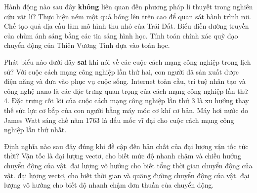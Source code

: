 \begin{ex}%
	Hành động nào sau đây \textbf{không} liên quan đến phương pháp lí thuyết trong nghiên cứu vật lí?
	\choice
	{\True Thực hiện ném một quả bóng lên trên cao để quan sát hành trình rơi.}
	{Chế tạo quả địa cầu làm mô hình thu nhỏ của Trái Đất.}
	{Biểu diễn đường truyền của chùm ánh sáng bằng các tia sáng hình học.}
	{Tính toán chính xác quỹ đạo chuyển động của Thiên Vương Tinh dựa vào toán học.}
\end{ex}

\begin{ex}%
	Phát biểu nào dưới đây \textbf{sai} khi nói về các cuộc cách mạng công nghiệp trong lịch sử?
	\choice
	{Với cuộc cách mạng công nghiệp lần thứ hai, con người đã sản xuất được điện năng và đưa vào phục vụ cuộc sống.}
	{Internet toàn cầu, trí tuệ nhân tạo và công nghệ nano là các đặc trưng quan trọng của cách mạng công nghiệp lần thứ 4.}
	{\True Đặc trưng cốt lõi của cuộc cách mạng công nghiệp lần thứ 3 là xu hướng thay thế sức lực cơ bắp của con người bằng máy móc cơ khí cơ bản.}
	{Máy hơi nước do James Watt sáng chế năm 1763 là dấu mốc vĩ đại cho cuộc cách mạng công nghiệp lần thứ nhất.}
\end{ex}

\begin{ex}%
	Định nghĩa nào sau đây đúng khi đề cập đến bản chất của đại lượng vận tốc tức thời? Vận tốc là
	\choice
	{\True đại lượng vectơ, cho biết mức độ nhanh chậm và chiều hướng chuyển động của vật.}
	{đại lượng vô hướng cho biết tổng thời gian chuyển động của vật.}
	{đại lượng vectơ, cho biết thời gian và quãng đường chuyển động của vật.}
	{đại lượng vô hướng cho biết độ nhanh chậm đơn thuần của chuyển động.}
\end{ex}

